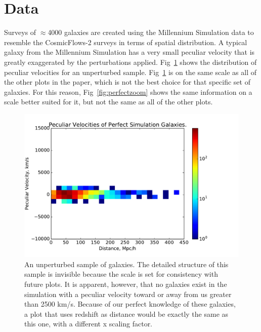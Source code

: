 \documentclass[usenatbib]{mn2e}
\begin{document}
\section{Data}
Surveys of $\approx$4000 galaxies are created using the Millennium Simulation data to resemble the CosmicFlows-2 surveys in terms of spatial distribution. A typical galaxy from the Millennium Simulation has a very small peculiar velocity that is greatly exaggerated by the perturbations applied. Fig~\ref{fig:perfect} shows the distribution of peculiar velocities for an unperturbed sample. Fig~\ref{fig:perfect} is on the same scale as all of the other plots in the paper, which is not the best choice for that specific set of galaxies. For this reason, Fig~\ref{fig:perfectzoom} shows the same information on a scale better suited for it, but not the same as all of the other plots.
\begin{figure}
  \begin{center}
  \includegraphics[scale=0.4]{perfect}
  \end{center}
\caption{\small An unperturbed sample of galaxies. The detailed structure of this sample is invisible because the scale is set for consistency with future plots. It is apparent, however, that no galaxies exist in the simulation with a peculiar velocity toward or away from us greater than 2500 km/s. Because of our perfect knowledge of these galaxies, a plot that uses redshift as distance would be exactly the same as this one, with a different x scaling factor.}
\label{fig:perfect}
\end{figure}
\end{document}
